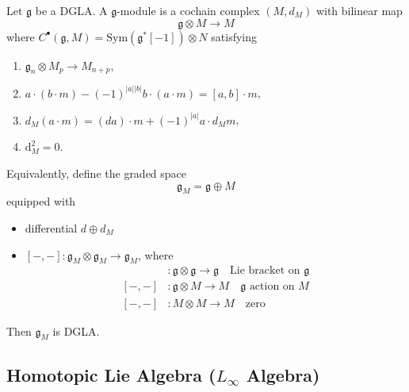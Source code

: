 \documentclass[10pt]{article}
\begin{document}
\begin{definition}
  Let $\mathfrak{g}$ be a DGLA. A $\mathfrak{g}$-module is a cochain complex $(M, d_M)$ with bilinear map
  \begin{equation*}
    \mathfrak{g} \otimes M \rightarrow M
  \end{equation*}
  where $ C^{\bullet}(\mathfrak{g}, M) = \mathrm{Sym}\left( \mathfrak{g}^{*}[-1] \right) \otimes N$ satisfying
  \begin{enumerate}[(1)]
    \item $\mathfrak{g}_n \otimes M_p \rightarrow M_{n+p}$,
    \item $a \cdot (b \cdot m) - (-1)^{|a||b|} b \cdot (a \cdot m) = [a, b] \cdot m$,
    \item $d_M(a \cdot m) = (d a) \cdot m + (-1)^{|a|} a \cdot d_M m$,
    \item $ \mathrm{d} _{M}^{2} = 0$.
  \end{enumerate}

  Equivalently, define the graded space
  \begin{equation*}
    \mathfrak{g}_M = \mathfrak{g} \oplus M
  \end{equation*}
  equipped with
  \begin{itemize}
    \item differential $d \oplus d_M$
    \item $[-,-]: \mathfrak{g}_M \otimes \mathfrak{g}_M \rightarrow \mathfrak{g}_M$, where
      \begin{align*}
        [-,-] &: \mathfrak{g} \otimes \mathfrak{g} \rightarrow \mathfrak{g} \quad \text{Lie bracket on $\mathfrak{g}$} \\
        [-,-] &: \mathfrak{g} \otimes M \rightarrow M \quad \text{$\mathfrak{g}$ action on $M$} \\
        [-,-] &: M \otimes M \rightarrow M \quad \text{zero}
      \end{align*}
  \end{itemize}
  Then $\mathfrak{g}_M$ is DGLA.
\end{definition}

\subsection{\texorpdfstring{Homotopic Lie Algebra ($L_{\infty }$ Algebra)}{Homotopic Lie Algebra (L_infinity Algebra)}}

\label{LastPage}
\end{document}
